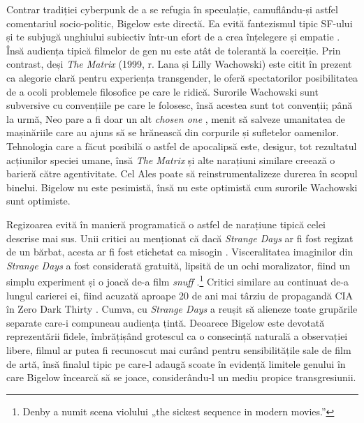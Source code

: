 \documentclass[12pt]{article}
\begin{document}
Contrar \dedouble tradiției\sqtworight\: cyberpunk de a se refugia în speculație, camuflându-și astfel comentariul socio-politic, Bigelow este directă. Ea evită fantezismul tipic SF-ului și te subjugă unghiului subiectiv într-un efort de a crea înțelegere și empatie \cite{Ebert1995a}. Însă audiența tipică filmelor de gen nu este atât de tolerantă la coerciție. Prin contrast, deși \textit{The Matrix} (1999, r. Lana și Lilly Wachowski) este citit în prezent ca alegorie clară pentru experiența transgender, le oferă spectatorilor posibilitatea de a ocoli problemele filosofice pe care le ridică.  Surorile Wachowski sunt subversive cu convențiile pe care le folosesc, însă acestea sunt tot convenții; până la urmă, Neo pare a fi doar un alt \textit{chosen one} \cite{LamanTrulyUnderstand2023}, menit să salveze umanitatea de mașinăriile care au ajuns să se hrănească din corpurile și sufletelor oamenilor. Tehnologia care a făcut posibilă o astfel de apocalipsă este, desigur, tot rezultatul acțiunilor speciei umane, însă \textit{The Matrix} și alte narațiuni similare creează o barieră către agentivitate. Cel Ales poate să reinstrumentalizeze durerea în scopul binelui. Bigelow nu este pesimistă, însă nu este optimistă cum surorile Wachowski sunt optimiste.\par

Regizoarea evită în manieră programatică o astfel de narațiune tipică celei descrise mai sus. Unii critici au menționat că dacă \textit{Strange Days} ar fi fost regizat de un bărbat, acesta ar fi fost etichetat ca misogin \cite{MirasolBigelowUncanny2010}. Visceralitatea imaginilor din \textit{Strange Days} a fost considerată gratuită, lipsită de un ochi moralizator, fiind un simplu experiment și o joacă de-a film \textit{snuff} \cite{Guthmann1995a, DenbyPeopleStrange1995}.\footnote{Denby a numit scena violului „the sickest sequence in modern movies.”} Critici similare au continuat de-a lungul carierei ei, fiind acuzată aproape 20 de ani mai târziu de propagandă CIA în Zero Dark Thirty \cite{Vishnevetsky2012a}. Cumva, cu \textit{Strange Days} a reușit să alieneze toate grupările separate care-i compuneau audiența țintă. Deoarece Bigelow este devotată reprezentării fidele, îmbrățișând grotescul ca o consecință naturală a observației libere, filmul ar putea fi recunoscut mai curând pentru sensibilitățile sale de film de artă, însă finalul tipic pe care-l adaugă scoate în evidență limitele genului în care Bigelow încearcă să se joace, considerându-l un mediu propice transgresiunii.\par
\end{document}
